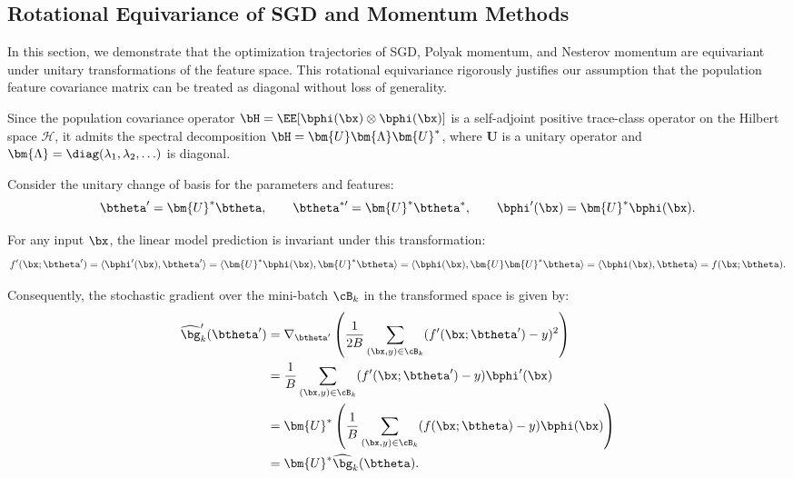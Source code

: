 \subsection{Rotational Equivariance of SGD and Momentum Methods}
\label{app:subsec:rotation invariant}

In this section, we demonstrate that the optimization trajectories of SGD, Polyak momentum, and Nesterov momentum are equivariant under unitary transformations of the feature space. This rotational equivariance rigorously justifies our assumption that the population feature covariance matrix 
 can be treated as diagonal without loss of generality.

Since the population covariance operator $\bH = \EE[\bphi(\bx) \otimes \bphi(\bx)]$ is a self-adjoint positive trace-class operator on the Hilbert space $\mathcal H$, it admits the spectral decomposition $\bH = \bm{U} \bm{\Lambda} \bm{U}^*$, where $\bm{U}$ is a unitary operator and $\bm{\Lambda} = \diag(\lambda_1, \lambda_2, \ldots)$ is diagonal.

Consider the unitary change of basis for the parameters and features:
\begin{equation*}
    \btheta' = \bm{U}^* \btheta, \qquad
    \btheta^{*\prime} = \bm{U}^* \btheta^*, \qquad
    \bphi'(\bx) = \bm{U}^* \bphi(\bx).
\end{equation*}

For any input $\bx$, the linear model prediction is invariant under this transformation:
\begin{equation*}
    f'(\bx; \btheta') 
    = \langle \bphi'(\bx), \btheta' \rangle 
    = \langle \bm{U}^* \bphi(\bx), \bm{U}^* \btheta \rangle 
    = \langle \bphi(\bx), \bm{U} \bm{U}^* \btheta \rangle 
    = \langle \bphi(\bx), \btheta \rangle 
    = f(\bx; \btheta).
\end{equation*}

Consequently, the stochastic gradient over the mini-batch $\cB_k$ in the transformed space is given by:
\begin{equation*}
\begin{aligned}
    \widehat{\bg}'_k(\btheta')
    &= \nabla_{\btheta'} \left( \frac{1}{2B}\sum_{(\bx,y)\in\cB_k}(f'(\bx;\btheta')-y)^2 \right) \\
    &= \frac{1}{B}\sum_{(\bx,y)\in\cB_k} (f'(\bx;\btheta')-y)\bphi'(\bx) \\
    &= \bm{U}^* \left( \frac{1}{B}\sum_{(\bx,y)\in\cB_k} (f(\bx;\btheta)-y)\bphi(\bx) \right) \\
    &= \bm{U}^* \widehat{\bg}_k(\btheta).
\end{aligned}
\end{equation*}

